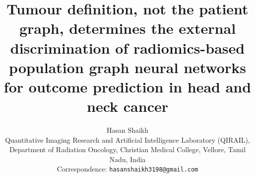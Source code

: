 \documentclass[11pt,a4paper]{article}
\begin{document}
\title{\vspace{-1.2cm}\Large\textbf{Tumour definition, not the patient graph, determines the external discrimination of radiomics-based population graph neural networks for outcome prediction in head and neck cancer}}
\author{\normalsize Hasan Shaikh\\[2pt]
\small Quantitative Imaging Research and Artificial Intelligence Laboratory (QIRAIL),\\
\small Department of Radiation Oncology, Christian Medical College, Vellore, Tamil Nadu, India\\
\small Correspondence: \texttt{hasanshaikh3198@gmail.com}}
\date{}

\maketitle
\vspace{-0.8cm}
\end{document}

